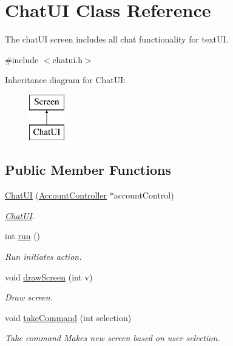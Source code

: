 \hypertarget{classChatUI}{}\section{Chat\+UI Class Reference}
\label{classChatUI}


The chat\+UI screen includes all chat functionality for text\+UI.  




{\ttfamily \#include $<$chatui.\+h$>$}

Inheritance diagram for Chat\+UI\+:\begin{figure}[H]
\begin{center}
\leavevmode
\includegraphics[height=2.000000cm]{classChatUI}
\end{center}
\end{figure}
\subsection*{Public Member Functions}
\begin{DoxyCompactItemize}
\item 
\hyperlink{classChatUI_a2bd7014d4576c384503cdf32c71be42e}{Chat\+UI} (\hyperlink{classAccountController}{Account\+Controller} $\ast$account\+Control)
\begin{DoxyCompactList}\small\item\em \hyperlink{classChatUI}{Chat\+UI}. \end{DoxyCompactList}\item 
int \hyperlink{classChatUI_a20ad296fac111935d72e5a37ca601e4d}{run} ()
\begin{DoxyCompactList}\small\item\em Run initiates action. \end{DoxyCompactList}\item 
void \hyperlink{classChatUI_a8b26be080ffb069e119e4482030a979a}{draw\+Screen} (int v)
\begin{DoxyCompactList}\small\item\em Draw screen. \end{DoxyCompactList}\item 
void \hyperlink{classChatUI_a0bb89a795649199686f1c93dc20c8ba6}{take\+Command} (int selection)
\begin{DoxyCompactList}\small\item\em Take command Makes new screen based on user selection. \end{DoxyCompactList}\end{DoxyCompactItemize}
